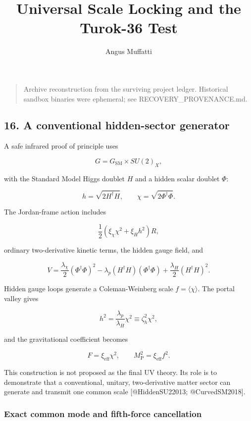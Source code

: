 \documentclass[
]{article}
\title{Universal Scale Locking and the Turok-36 Test}
\author{Angus Muffatti}
\date{}
\begin{document}
\maketitle

\begin{quote}
Archive reconstruction from the surviving project ledger. Historical
sandbox binaries were ephemeral; see RECOVERY\_PROVENANCE.md.
\end{quote}

\hypertarget{a-conventional-hidden-sector-generator}{%
\subsection{16. A conventional hidden-sector
generator}\label{a-conventional-hidden-sector-generator}}

A safe infrared proof of principle uses

\[
G=G_{\mathrm{SM}}\times SU(2)_X,
\]

with the Standard Model Higgs doublet \(H\) and a hidden scalar doublet
\(\Phi\):

\[
h=\sqrt{2H^\dagger H},
\qquad
\chi=\sqrt{2\Phi^\dagger\Phi}.
\]

The Jordan-frame action includes

\[
\frac12(\xi_\chi\chi^2+\xi_Hh^2)R,
\]

ordinary two-derivative kinetic terms, the hidden gauge field, and

\[
V
=\frac{\lambda_\chi}{2}(\Phi^\dagger\Phi)^2
-\lambda_p(H^\dagger H)(\Phi^\dagger\Phi)
+\frac{\lambda_H}{2}(H^\dagger H)^2.
\]

Hidden gauge loops generate a Coleman-Weinberg scale
\(f=\langle\chi\rangle\). The portal valley gives

\[
h^2=\frac{\lambda_p}{\lambda_H}\chi^2
\equiv\zeta_h^2\chi^2,
\]

and the gravitational coefficient becomes

\[
F=\xi_{\mathrm{eff}}\chi^2,
\qquad
M_{\mathrm{P}}^2=\xi_{\mathrm{eff}}f^2.
\]

This construction is not proposed as the final UV theory. Its role is to
demonstrate that a conventional, unitary, two-derivative matter sector
can generate and transmit one common scale {[}@HiddenSU22013;
@CurvedSM2018{]}.

\hypertarget{exact-common-mode-and-fifth-force-cancellation}{%
\subsubsection{Exact common mode and fifth-force
cancellation}\label{exact-common-mode-and-fifth-force-cancellation}}
\end{document}
